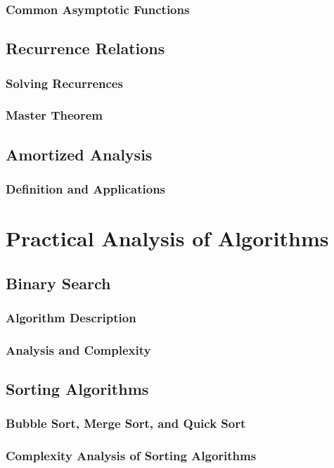 \documentclass[12pt]{book} %
\begin{document}
\subsubsection{Common Asymptotic Functions}
\subsection{Recurrence Relations}
\subsubsection{Solving Recurrences}
\subsubsection{Master Theorem}
\subsection{Amortized Analysis}
\subsubsection{Definition and Applications}

\section{Practical Analysis of Algorithms}
\subsection{Binary Search}
\subsubsection{Algorithm Description}
\subsubsection{Analysis and Complexity}
\subsection{Sorting Algorithms}
\subsubsection{Bubble Sort, Merge Sort, and Quick Sort}
\subsubsection{Complexity Analysis of Sorting Algorithms}
\end{document}
